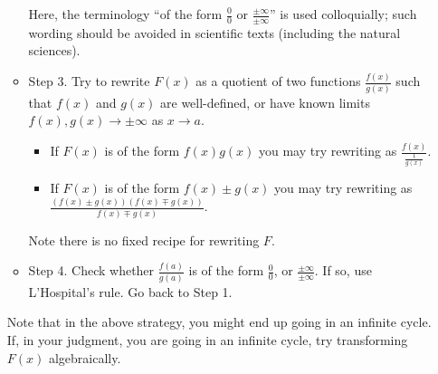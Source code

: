 \documentclass[12pt]{book}
\begin{document}
\begin{itemize}
\begin{itemize}
Here, the terminology ``of the form $\frac{0}{0}$ or $\frac{\pm\infty}{\pm \infty}$'' is used colloquially; such wording should be avoided in scientific texts (including the natural sciences).
\item Step 3. Try to rewrite $F(x)$ as a quotient of two functions $\frac{f(x)}{g(x)}$ such that $f(x)$ and $g(x)$ are well-defined, or have known limits $f(x), g(x)\to \pm \infty$ as $x\to a$.
\begin{itemize}
\item If $F(x)$ is of the form $f(x)g(x)$ you may try rewriting as $\frac{f(x)}{\frac{1}{g(x)}}$.
\item If $F(x)$ is of the form $f(x)\pm g(x)$ you may try rewriting as $\frac{(f(x)\pm g(x))(f(x)\mp g(x))}{f(x)\mp g(x)}$.
\end{itemize}
Note there is no fixed recipe for rewriting $F$.
\item Step 4. Check whether $\frac{f(a)}{g(a)}$ is of the form $\frac{0}{0}$, or $\frac{\pm\infty}{\pm \infty}$. If so, use L'Hospital's rule. Go back to Step 1.
\end{itemize}
Note that in the above strategy, you might end up going in an infinite cycle. If, in your judgment, you are going in an infinite cycle, try transforming $F(x)$ algebraically.

\end{itemize}
\end{document}
